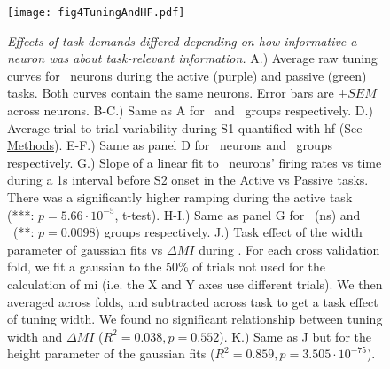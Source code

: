 	\begin{figure}
		\centering
		\captionsetup{singlelinecheck = false, font=footnotesize, labelsep=space}
		\texttt{[image: fig4TuningAndHF.pdf]}
		\caption{{\it Effects of task demands differed depending on how informative a neuron was about task-relevant information.} A.) Average raw tuning curves for \enhanced\ neurons during the active (purple) and passive (green) tasks. Both curves contain the same neurons. Error bars are $\pm SEM$ across neurons. B-C.) Same as A for \suppressed\ and \consistent\ groups respectively. D.) Average trial-to-trial variability during S1 quantified with \gls{hf} (See \hyperref[{sec:methods}]{Methods}). E-F.) Same as panel D for \suppressed\ neurons and \consistent\ groups respectively. G.) Slope of a linear fit to \enhanced\ neurons' firing rates vs time during a 1s interval before S2 onset in the Active vs Passive tasks. There was a significantly higher ramping during the active task (***: $p=5.66\cdot10^{-5}$, t-test). H-I.) Same as panel G for \suppressed\ (ns) and \consistent\ (**: $p=0.0098$) groups respectively. J.) Task effect of the width parameter of gaussian fits vs $\Delta MI$ during \sample. For each cross validation fold, we fit a gaussian to the 50\% of trials not used for the calculation of \gls{mi} (i.e. the X and Y axes use different trials). We then averaged across folds, and subtracted across task to get a task effect of tuning width. We found no significant relationship between tuning width and $\Delta MI$ ($R^2=0.038, p=0.552$). K.) Same as J but for the height parameter of the gaussian fits ($R^2=0.859, p=3.505 \cdot 10^{-75}$). }
		\label{fig:interaction}
	\end{figure}
	\addtocounter{page}{-1}
	\thispagestyle{empty}
	\clearpage


